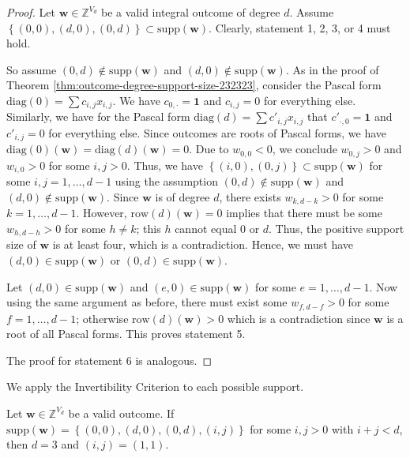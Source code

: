 \begin{proof}
    Let \( \mathbf{w} \in \mathbb{Z}^{V_d} \) be a valid integral outcome of degree \( d \). Assume  \(  \left\{ (0,0), (d,0), (0,d) \right\} \subset \mathrm{supp}(\mathbf{w}) \). Clearly, statement 1, 2, 3, or 4 must hold.

    So assume \( (0,d) \notin \mathrm{supp}(\mathbf{w}) \) and  \( (d,0) \notin \mathrm{supp}(\mathbf{w}) \). As in the proof of Theorem \ref{thm:outcome-degree-support-size-232323}, consider the Pascal form \( \mathrm{diag}(0) = \sum c_{i,j} x_{i,j} \). We have \( c_{0, \cdot} = \mathbf 1 \) and \( c_{i,j} = 0 \) for everything else. Similarly, we have for the Pascal form \( \mathrm{diag}(d) = \sum c'_{i,j} x_{i,j} \) that \( c'_{\cdot, 0} = \mathbf 1 \) and \( c'_{i,j} = 0 \) for everything else. Since outcomes are roots of Pascal forms, we have \( \mathrm{diag}(0)(\mathbf w) = \mathrm{diag}(d)(\mathbf w) = 0 \).
    Due to \( w_{0,0} < 0 \), we conclude \( w_{0,j} > 0 \) and \( w_{i, 0} > 0 \) for some \( i,j > 0 \). Thus, we have \( \left\{ (i,0), (0,j) \right\} \subset \mathrm{supp}(\mathbf{w}) \)
    for some \( i,j = 1, \dots, d-1 \) using the assumption  \( (0,d) \notin \mathrm{supp}(\mathbf{w}) \) and  \( (d,0) \notin \mathrm{supp}(\mathbf{w}) \). Since \( \mathbf{w} \) is of degree \( d \), there exists \( w_{k,d-k} > 0 \) for some \( k = 1, \dots, d-1 \). However, \( \mathrm{row}(d)(\mathbf{w}) = 0 \) implies that there must be some \( w_{h,d-h} > 0\) for some \( h \neq k \); this \( h \) cannot equal \( 0 \) or \( d \). Thus, the positive support size of \( \mathbf{w} \) is at least four, which is a contradiction. Hence, we must have \( (d,0) \in \mathrm{supp}(\mathbf{w}) \) or \( (0,d) \in \mathrm{supp}(\mathbf{w}) \).

    Let \( (d,0) \in \mathrm{supp}(\mathbf{w}) \) and \( (e, 0) \in \mathrm{supp}(\mathbf{w}) \) for some \( e = 1, \dots, d-1 \). Now using the same argument as before, there must exist some \( w_{f,d-f} > 0 \) for some \( f = 1, \dots, d-1 \); otherwise \( \mathrm{row}(d)(\mathbf{w}) > 0 \) which is a contradiction since \( \mathbf{w} \) is a root of all Pascal forms. This proves statement 5. 
    
    The proof for statement 6 is analogous.
\end{proof}

We apply the Invertibility Criterion to each possible support.

\begin{proposition}\label{prop:32j23rj3289}
    Let \( \mathbf{w} \in \mathbb{Z}^{V_d} \) be a valid outcome. If \( \mathrm{supp}(\mathbf{w}) = \left\{ (0,0), (d,0), (0,d), (i,j) \right\} \) for some \( i,j > 0 \) with \( i+j < d \), then \( d = 3 \) and \( (i,j) = (1,1) \).
\end{proposition}

